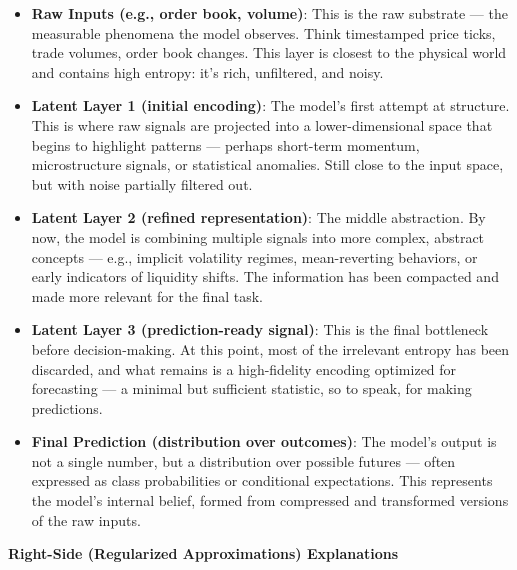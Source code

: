 \begin{itemize}
    \item \textbf{Raw Inputs (e.g., order book, volume)}: This is the raw substrate — the measurable phenomena the model observes. Think timestamped price ticks, trade volumes, order book changes. This layer is closest to the physical world and contains high entropy: it’s rich, unfiltered, and noisy.

    \item \textbf{Latent Layer 1 (initial encoding)}: The model’s first attempt at structure. This is where raw signals are projected into a lower-dimensional space that begins to highlight patterns — perhaps short-term momentum, microstructure signals, or statistical anomalies. Still close to the input space, but with noise partially filtered out.

    \item \textbf{Latent Layer 2 (refined representation)}: The middle abstraction. By now, the model is combining multiple signals into more complex, abstract concepts — e.g., implicit volatility regimes, mean-reverting behaviors, or early indicators of liquidity shifts. The information has been compacted and made more relevant for the final task.

    \item \textbf{Latent Layer 3 (prediction-ready signal)}: This is the final bottleneck before decision-making. At this point, most of the irrelevant entropy has been discarded, and what remains is a high-fidelity encoding optimized for forecasting — a minimal but sufficient statistic, so to speak, for making predictions.

    \item \textbf{Final Prediction (distribution over outcomes)}: The model’s output is not a single number, but a distribution over possible futures — often expressed as class probabilities or conditional expectations. This represents the model’s internal belief, formed from compressed and transformed versions of the raw inputs.
\end{itemize}

\vspace{1em}
\textbf{Right-Side (Regularized Approximations) Explanations}

